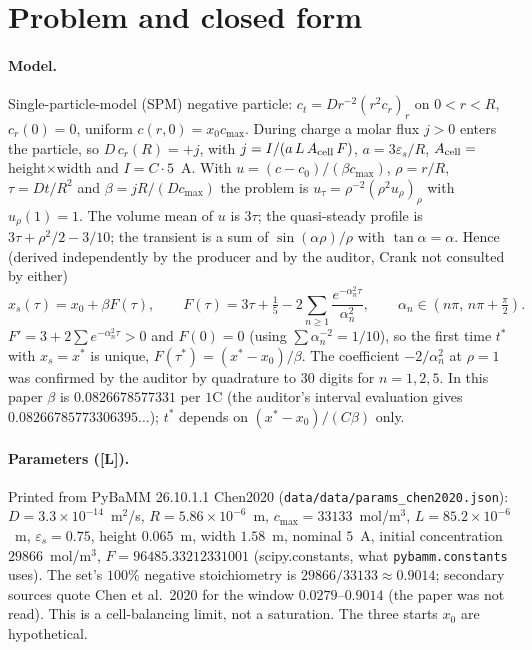\documentclass[10pt]{article}
\newcommand{\tier}[1]{\textsf{[#1]}}
\newcommand{\tL}{\tier{L}}
\newcommand{\cmax}{c_{\max}}
\begin{document}
\section{Problem and closed form}\label{sec:setting}
\paragraph{Model.} Single-particle-model (SPM) negative particle: $c_t=Dr^{-2}(r^2c_r)_r$ on $0<r<R$, $c_r(0)=0$, uniform $c(r,0)=x_0\cmax$. During charge a molar flux $j>0$ enters the particle, so $D\,c_r(R)=+j$, with $j=I/(a\,L\,A_{\rm cell}\,F)$, $a=3\varepsilon_s/R$, $A_{\rm cell}=$ height$\times$width and $I=C\cdot5$~A. With $u=(c-c_0)/(\beta\cmax)$, $\rho=r/R$, $\tau=Dt/R^2$ and $\beta=jR/(D\cmax)$ the problem is $u_\tau=\rho^{-2}(\rho^2u_\rho)_\rho$ with $u_\rho(1)=1$. The volume mean of $u$ is $3\tau$; the quasi-steady profile is $3\tau+\rho^2/2-3/10$; the transient is a sum of $\sin(\alpha\rho)/\rho$ with $\tan\alpha=\alpha$. Hence (derived independently by the producer and by the auditor, Crank not consulted by either)
\[
x_s(\tau)=x_0+\beta F(\tau),\qquad F(\tau)=3\tau+\tfrac15-2\sum_{n\ge1}\frac{e^{-\alpha_n^2\tau}}{\alpha_n^2},\qquad \alpha_n\in(n\pi,\,n\pi+\tfrac\pi2).
\]
$F'=3+2\sum e^{-\alpha_n^2\tau}>0$ and $F(0)=0$ (using $\sum\alpha_n^{-2}=1/10$), so the first time $t^*$ with $x_s=x^*$ is unique, $F(\tau^*)=(x^*-x_0)/\beta$. The coefficient $-2/\alpha_n^2$ at $\rho=1$ was confirmed by the auditor by quadrature to $30$ digits for $n=1,2,5$. In this paper $\beta$ is $0.0826678577331$ per $1$C (the auditor's interval evaluation gives $0.08266785773306395\ldots$); $t^*$ depends on $(x^*-x_0)/(C\beta)$ only.

\paragraph{Parameters (\tL{}).} Printed from PyBaMM 26.10.1.1 Chen2020 (\texttt{data/data/params\_chen2020.json}): $D=3.3\times10^{-14}$~m$^2$/s, $R=5.86\times10^{-6}$~m, $\cmax=33133$~mol/m$^3$, $L=85.2\times10^{-6}$~m, $\varepsilon_s=0.75$, height $0.065$~m, width $1.58$~m, nominal $5$~A, initial concentration $29866$~mol/m$^3$, $F=96485.33212331001$ (scipy.constants, what \texttt{pybamm.constants} uses). The set's $100\%$ negative stoichiometry is $29866/33133\approx0.9014$; secondary sources quote Chen et al.\ 2020 for the window $0.0279$--$0.9014$ (the paper was not read). This is a cell-balancing limit, not a saturation. The three starts $x_0$ are hypothetical.
\end{document}
